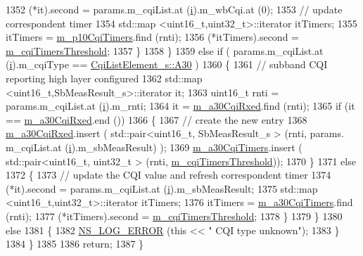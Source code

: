 \begin{DoxyCode}
1352               (*it).second = params.m\_cqiList.at (\hyperlink{bernuolliDistribution_8m_a6f6ccfcf58b31cb6412107d9d5281426}{i}).m\_wbCqi.at (0);
1353               \textcolor{comment}{// update correspondent timer}
1354               std::map <uint16\_t,uint32\_t>::iterator itTimers;
1355               itTimers = \hyperlink{classns3_1_1FdBetFfMacScheduler_ab8a2a1181e0beecba1ec83576b9ff043}{m\_p10CqiTimers}.find (rnti);
1356               (*itTimers).second = \hyperlink{classns3_1_1FdBetFfMacScheduler_ad25e8d5207cfa78201a9af0d38aab817}{m\_cqiTimersThreshold};
1357             \}
1358         \}
1359       \textcolor{keywordflow}{else} \textcolor{keywordflow}{if} ( params.m\_cqiList.at (\hyperlink{bernuolliDistribution_8m_a6f6ccfcf58b31cb6412107d9d5281426}{i}).m\_cqiType == \hyperlink{structns3_1_1CqiListElement__s_a8f1bd827fd9842e7c07e39265d88299aab9a9d64494e36c89d7932a00edb056a7}{CqiListElement\_s::A30} )
1360         \{
1361           \textcolor{comment}{// subband CQI reporting high layer configured}
1362           std::map <uint16\_t,SbMeasResult\_s>::iterator it;
1363           uint16\_t rnti = params.m\_cqiList.at (\hyperlink{bernuolliDistribution_8m_a6f6ccfcf58b31cb6412107d9d5281426}{i}).m\_rnti;
1364           it = \hyperlink{classns3_1_1FdBetFfMacScheduler_ab5e71846932710964119a81bccdbd602}{m\_a30CqiRxed}.find (rnti);
1365           \textcolor{keywordflow}{if} (it == \hyperlink{classns3_1_1FdBetFfMacScheduler_ab5e71846932710964119a81bccdbd602}{m\_a30CqiRxed}.end ())
1366             \{
1367               \textcolor{comment}{// create the new entry}
1368               \hyperlink{classns3_1_1FdBetFfMacScheduler_ab5e71846932710964119a81bccdbd602}{m\_a30CqiRxed}.insert ( std::pair<uint16\_t, SbMeasResult\_s > (rnti, params.
      m\_cqiList.at (\hyperlink{bernuolliDistribution_8m_a6f6ccfcf58b31cb6412107d9d5281426}{i}).m\_sbMeasResult) );
1369               \hyperlink{classns3_1_1FdBetFfMacScheduler_a8a887ae2aea7f983bb40f3effd776c25}{m\_a30CqiTimers}.insert ( std::pair<uint16\_t, uint32\_t > (rnti, 
      \hyperlink{classns3_1_1FdBetFfMacScheduler_ad25e8d5207cfa78201a9af0d38aab817}{m\_cqiTimersThreshold}));
1370             \}
1371           \textcolor{keywordflow}{else}
1372             \{
1373               \textcolor{comment}{// update the CQI value and refresh correspondent timer}
1374               (*it).second = params.m\_cqiList.at (\hyperlink{bernuolliDistribution_8m_a6f6ccfcf58b31cb6412107d9d5281426}{i}).m\_sbMeasResult;
1375               std::map <uint16\_t,uint32\_t>::iterator itTimers;
1376               itTimers = \hyperlink{classns3_1_1FdBetFfMacScheduler_a8a887ae2aea7f983bb40f3effd776c25}{m\_a30CqiTimers}.find (rnti);
1377               (*itTimers).second = \hyperlink{classns3_1_1FdBetFfMacScheduler_ad25e8d5207cfa78201a9af0d38aab817}{m\_cqiTimersThreshold};
1378             \}
1379         \}
1380       \textcolor{keywordflow}{else}
1381         \{
1382           \hyperlink{group__logging_ga0261a8db1d4ac5f79417d117634fd455}{NS\_LOG\_ERROR} (\textcolor{keyword}{this} << \textcolor{stringliteral}{" CQI type unknown"});
1383         \}
1384     \}
1385 
1386   \textcolor{keywordflow}{return};
1387 \}
\end{DoxyCode}



